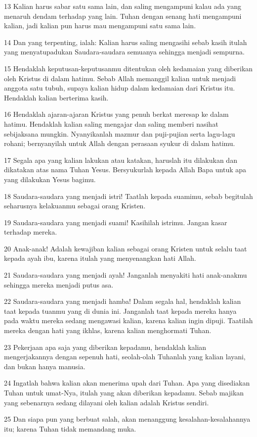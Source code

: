 \par 13 Kalian harus sabar satu sama lain, dan saling mengampuni kalau ada yang menaruh dendam terhadap yang lain. Tuhan dengan senang hati mengampuni kalian, jadi kalian pun harus mau mengampuni satu sama lain.
\par 14 Dan yang terpenting, ialah: Kalian harus saling mengasihi sebab kasih itulah yang menyatupadukan Saudara-saudara semuanya sehingga menjadi sempurna.
\par 15 Hendaklah keputusan-keputusanmu ditentukan oleh kedamaian yang diberikan oleh Kristus di dalam hatimu. Sebab Allah memanggil kalian untuk menjadi anggota satu tubuh, supaya kalian hidup dalam kedamaian dari Kristus itu. Hendaklah kalian berterima kasih.
\par 16 Hendaklah ajaran-ajaran Kristus yang penuh berkat meresap ke dalam hatimu. Hendaklah kalian saling mengajar dan saling memberi nasihat sebijaksana mungkin. Nyanyikanlah mazmur dan puji-pujian serta lagu-lagu rohani; bernyanyilah untuk Allah dengan perasaan syukur di dalam hatimu.
\par 17 Segala apa yang kalian lakukan atau katakan, haruslah itu dilakukan dan dikatakan atas nama Tuhan Yesus. Bersyukurlah kepada Allah Bapa untuk apa yang dilakukan Yesus bagimu.
\par 18 Saudara-saudara yang menjadi istri! Taatlah kepada suamimu, sebab begitulah seharusnya kelakuanmu sebagai orang Kristen.
\par 19 Saudara-saudara yang menjadi suami! Kasihilah istrimu. Jangan kasar terhadap mereka.
\par 20 Anak-anak! Adalah kewajiban kalian sebagai orang Kristen untuk selalu taat kepada ayah ibu, karena itulah yang menyenangkan hati Allah.
\par 21 Saudara-saudara yang menjadi ayah! Janganlah menyakiti hati anak-anakmu sehingga mereka menjadi putus asa.
\par 22 Saudara-saudara yang menjadi hamba! Dalam segala hal, hendaklah kalian taat kepada tuanmu yang di dunia ini. Janganlah taat kepada mereka hanya pada waktu mereka sedang mengawasi kalian, karena kalian ingin dipuji. Taatilah mereka dengan hati yang ikhlas, karena kalian menghormati Tuhan.
\par 23 Pekerjaan apa saja yang diberikan kepadamu, hendaklah kalian mengerjakannya dengan sepenuh hati, seolah-olah Tuhanlah yang kalian layani, dan bukan hanya manusia.
\par 24 Ingatlah bahwa kalian akan menerima upah dari Tuhan. Apa yang disediakan Tuhan untuk umat-Nya, itulah yang akan diberikan kepadamu. Sebab majikan yang sebenarnya sedang dilayani oleh kalian adalah Kristus sendiri.
\par 25 Dan siapa pun yang berbuat salah, akan menanggung kesalahan-kesalahannya itu; karena Tuhan tidak memandang muka.

